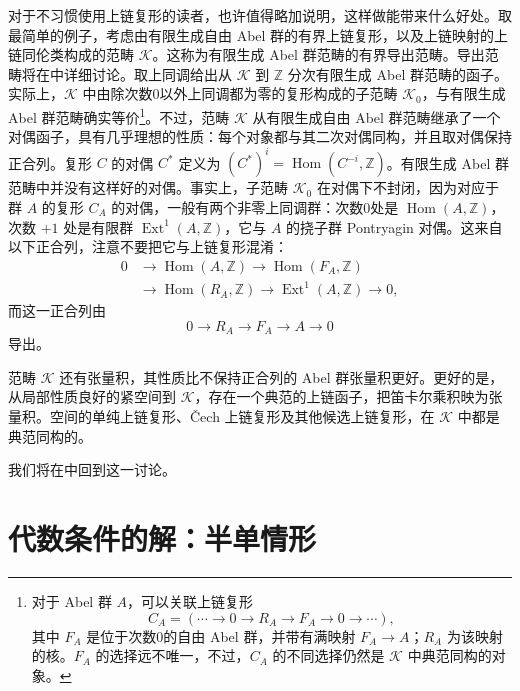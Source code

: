 对于不习惯使用上链复形的读者，也许值得略加说明，这样做能带来什么好处。取最简单的例子，考虑由有限生成自由 Abel 群的有界上链复形，以及上链映射的上链同伦类构成的范畴 $\mathcal{K}$。这称为有限生成 Abel 群范畴的有界导出范畴。导出范畴将在中详细讨论。取上同调给出从 $\mathcal{K}$ 到 $\mathbb{Z}$ 分次有限生成 Abel 群范畴的函子。实际上，$\mathcal{K}$ 中由除次数0以外上同调都为零的复形构成的子范畴 $\mathcal{K}_0$，与有限生成 Abel 群范畴确实等价\footnote{对于 Abel 群 $A$，可以关联上链复形
\[
C_A=(\cdots\longrightarrow0\longrightarrow R_A\longrightarrow F_A\longrightarrow0\longrightarrow\cdots),
\]
其中 $F_A$ 是位于次数0的自由 Abel 群，并带有满映射 $F_A\to A$；$R_A$ 为该映射的核。$F_A$ 的选择远不唯一，不过，$C_A$ 的不同选择仍然是 $\mathcal{K}$ 中典范同构的对象。}。不过，范畴 $\mathcal{K}$ 从有限生成自由 Abel 群范畴继承了一个对偶函子，具有几乎理想的性质：每个对象都与其二次对偶同构，并且取对偶保持正合列。复形 $C$ 的对偶 $C^*$ 定义为 $(C^*)^i=\operatorname{Hom}(C^{-i},\mathbb{Z})$。有限生成 Abel 群范畴中并没有这样好的对偶。事实上，子范畴 $\mathcal{K}_0$ 在对偶下不封闭，因为对应于群 $A$ 的复形 $C_A$ 的对偶，一般有两个非零上同调群：次数0处是 $\operatorname{Hom}(A,\mathbb{Z})$，次数 $+1$ 处是有限群 $\operatorname{Ext}^1(A,\mathbb{Z})$，它与 $A$ 的挠子群 Pontryagin 对偶。这来自以下正合列，注意不要把它与上链复形混淆：
\begin{equation}\label{eq:2.28}
\begin{aligned}
0&\longrightarrow\operatorname{Hom}(A,\mathbb{Z})\longrightarrow\operatorname{Hom}(F_A,\mathbb{Z})\\
&\longrightarrow\operatorname{Hom}(R_A,\mathbb{Z})\longrightarrow\operatorname{Ext}^1(A,\mathbb{Z})\longrightarrow0,
\end{aligned}
\end{equation}
而这一正合列由
\[
0\longrightarrow R_A\longrightarrow F_A\longrightarrow A\longrightarrow0
\]
导出。

范畴 $\mathcal{K}$ 还有张量积，其性质比不保持正合列的 Abel 群张量积更好。更好的是，从局部性质良好的紧空间到 $\mathcal{K}$，存在一个典范的上链函子，把笛卡尔乘积映为张量积。空间的单纯上链复形、Čech 上链复形及其他候选上链复形，在 $\mathcal{K}$ 中都是典范同构的。

我们将在中回到这一讨论。

\section{代数条件的解：半单情形}\label{sec:2.2}
